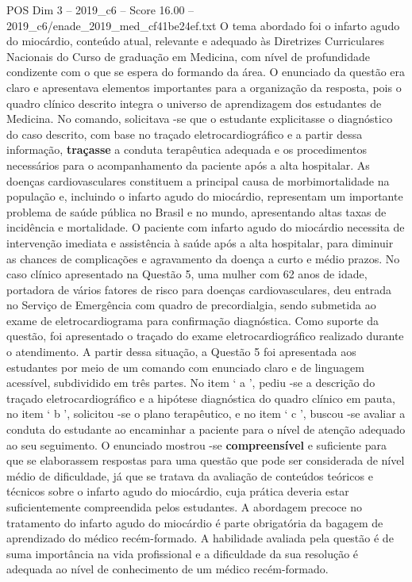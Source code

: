 \begin{textsample}{POS Dim 3 – 2019\_c6 – Score 16.00 – 2019\_c6/enade\_2019\_med\_cf41be24ef.txt}
O tema abordado foi o infarto agudo do miocárdio, conteúdo atual, relevante e adequado às Diretrizes Curriculares Nacionais do Curso de graduação em Medicina, com nível de profundidade condizente com o que se espera do formando da área.
O enunciado da questão era claro e apresentava elementos importantes para a organização da resposta, pois o quadro clínico descrito integra o universo de aprendizagem dos estudantes de Medicina.
No comando, solicitava -se que o estudante explicitasse o diagnóstico do caso descrito, com base no traçado eletrocardiográfico e a partir dessa informação, \textbf{traçasse} a conduta terapêutica adequada e os procedimentos necessários para o acompanhamento da paciente após a alta hospitalar.
As doenças cardiovasculares constituem a principal causa de morbimortalidade na população e, incluindo o infarto agudo do miocárdio, representam um importante problema de saúde pública no Brasil e no mundo, apresentando altas taxas de incidência e mortalidade.
O paciente com infarto agudo do miocárdio necessita de intervenção imediata e assistência à saúde após a alta hospitalar, para diminuir as chances de complicações e agravamento da doença a curto e médio prazos.
No caso clínico apresentado na Questão 5, uma mulher com 62 anos de idade, portadora de vários fatores de risco para doenças cardiovasculares, deu entrada no Serviço de Emergência com quadro de precordialgia, sendo submetida ao exame de eletrocardiograma para confirmação diagnóstica.
Como suporte da questão, foi apresentado o traçado do exame eletrocardiográfico realizado durante o atendimento.
A partir dessa situação, a Questão 5 foi apresentada aos estudantes por meio de um comando com enunciado claro e de linguagem acessível, subdividido em três partes.
No item ‘ a ’, pediu -se a descrição do traçado eletrocardiográfico e a hipótese diagnóstica do quadro clínico em pauta, no item ‘ b ’, solicitou -se o plano terapêutico, e no item ‘ c ’, buscou -se avaliar a conduta do estudante ao encaminhar a paciente para o nível de atenção adequado ao seu seguimento.
O enunciado mostrou -se \textbf{compreensível} e suficiente para que se elaborassem respostas para uma questão que pode ser considerada de nível médio de dificuldade, já que se tratava da avaliação de conteúdos teóricos e técnicos sobre o infarto agudo do miocárdio, cuja prática deveria estar suficientemente compreendida pelos estudantes.
A abordagem precoce no tratamento do infarto agudo do miocárdio é parte obrigatória da bagagem de aprendizado do médico recém-formado.
A habilidade avaliada pela questão é de suma importância na vida profissional e a dificuldade da sua resolução é adequada ao nível de conhecimento de um médico recém-formado.

\end{textsample}
